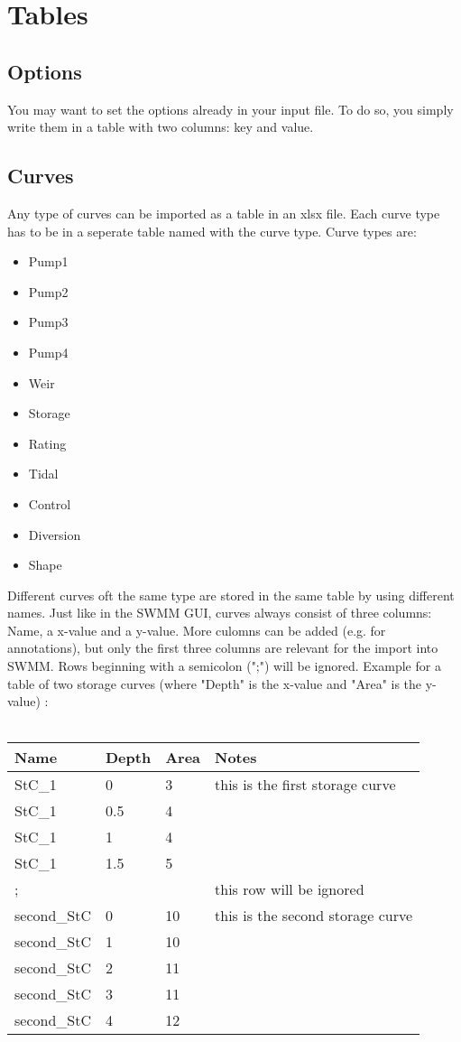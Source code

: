 \documentclass[10pt,a4paper,oneside]{scrbook}
\begin{document}
\section{Tables}

\subsection{Options}
You may want to set the options already in your input file. To do so, you simply write them in a table with two columns: key and value. \newline


\subsection{Curves}
Any type of curves can be imported as a table in an xlsx file. Each curve type has to be in a seperate table named with the curve type. Curve types are:
\begin{itemize}
	\setlength\itemsep{0pt}
	\item Pump1
	\item Pump2
	\item Pump3
	\item Pump4
	\item Weir
	\item Storage
	\item Rating
	\item Tidal
	\item Control
	\item Diversion
	\item Shape
\end{itemize}
Different curves oft the same type are stored in the same table by using different names. Just like in the SWMM GUI, curves always consist of three columns: Name, a x-value and a y-value. More culomns can be added (e.g. for annotations), but only the first three columns are relevant for the import into SWMM. Rows beginning with a semicolon (";") will be ignored. Example for a table of two storage curves (where "Depth" is the x-value and "Area" is the y-value) :\\
\\
\begin{tabular}{|p{1.7cm}|p{1.3cm}|P{1.3cm}|P{6cm}|}
\hline 
\textbf{Name} & \textbf{Depth} & \textbf{Area} & \textbf{Notes}\\ 
\hline 
StC\_1 & 0 & 3 & this is the first storage curve\\
\hline 
StC\_1 & 0.5 & 4 & \\
\hline 
StC\_1 & 1 & 4 & \\
\hline 
StC\_1 & 1.5 & 5 & \\
\hline 
; &  &  & this row will be ignored\\
\hline 
second\_StC & 0 & 10 & this is the second storage curve\\
\hline 
second\_StC & 1 & 10 & \\
\hline 
second\_StC & 2 & 11 & \\
\hline 
second\_StC & 3 & 11 & \\
\hline 
second\_StC & 4 & 12 & \\
\hline 
\end{tabular}
\end{document}
